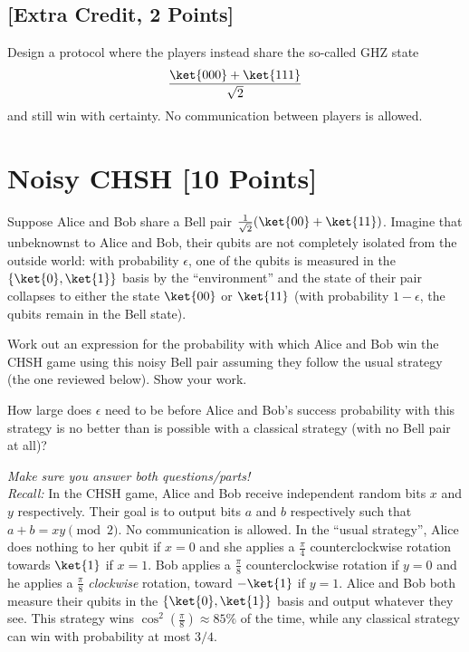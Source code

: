 \documentclass[11pt]{article}
\begin{document}
\subsection{[Extra Credit, 2 Points]} Design a protocol where the players instead share the so-called GHZ state
\[
\frac{\ket{000} + \ket{111}}{\sqrt{2}}
\]
and still win with certainty. No communication between players is allowed.



\section{Noisy CHSH [10 Points]} Suppose Alice and Bob share a Bell pair $\frac{1}{\sqrt{2}}(\ket{00}+\ket{11})$. Imagine that unbeknownst to Alice and Bob, their qubits are not completely isolated from the outside world: with probability $\epsilon$, one of the qubits is measured in the $\{\ket{0},\ket{1}\}$ basis by the ``environment'' and the state of their pair collapses to either the state $\ket{00}$ or $\ket{11}$ (with probability $1-\epsilon$, the qubits remain in the Bell state). 

Work out an expression for the probability with which Alice and Bob win the CHSH game using this noisy Bell pair assuming they follow the usual strategy (the one reviewed below). Show your work.

How large does $\epsilon$ need to be before Alice and Bob's success probability with this strategy is no better than is possible with a classical strategy (with no Bell pair at all)?

\textit{Make sure you answer both questions/parts!}
\\

\textit{Recall:} In the CHSH game, Alice and Bob receive independent random bits $x$ and $y$ respectively. Their goal is to output bits $a$ and $b$ respectively such that $a+b=xy \pmod{2}$. No communication is allowed.  In the ``usual strategy'', Alice does nothing to her qubit if $x=0$ and she applies a $\frac{\pi}{4}$ counterclockwise rotation towards $\ket{1}$ if $x=1$. Bob applies a $\frac{\pi}{8}$ counterclockwise rotation if $y=0$ and he applies a $\frac{\pi}{8}$ \textit{clockwise} rotation, toward $-\ket{1}$ if $y=1$. Alice and Bob both measure their qubits in the $\{ \ket{0},\ket{1} \}$ basis and output whatever they see. This strategy wins $\cos^2\left(\frac{\pi}{8}\right) \approx 85\%$ of the time, while any classical strategy can win with probability at most $3/4$.
\end{document}
